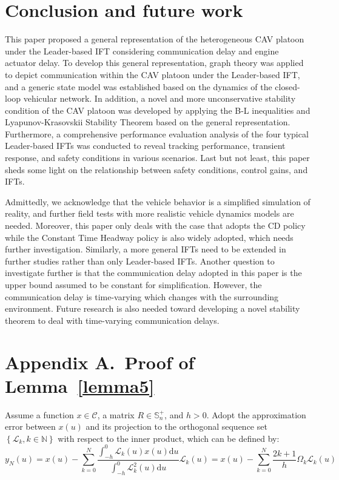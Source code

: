 \documentclass[a4paper]{cas-sc}
\begin{document}
\section{Conclusion and future work}
\label{Section 6}

This paper proposed a general representation of the heterogeneous CAV platoon under the Leader-based IFT considering communication delay and engine actuator delay. To develop this general representation, graph theory was applied to depict communication within the CAV platoon under the Leader-based IFT, and a generic state model was established based on the dynamics of the closed-loop vehicular network. In addition, a novel and more unconservative stability condition of the CAV platoon was developed by applying the B-L inequalities and Lyapunov-Krasovskii Stability Theorem based on the general representation. Furthermore, a comprehensive performance evaluation analysis of the four typical Leader-based IFTs was conducted to reveal tracking performance, transient response, and safety conditions in various scenarios. Last but not least, this paper sheds some light on the relationship between safety conditions, control gains, and IFTs.

Admittedly, we acknowledge that the vehicle behavior is a simplified simulation of reality, and further field tests with more realistic vehicle dynamics models are needed. Moreover, this paper only deals with the case that adopts the CD policy while the Constant Time Headway policy is also widely adopted, which needs further investigation. Similarly, a more general IFTs need to be extended in further studies rather than only Leader-based IFTs. Another question to investigate further is that the communication delay adopted in this paper is the upper bound assumed to be constant for simplification. However, the communication delay is time-varying which changes with the surrounding environment. Future research is also needed toward developing a novel stability theorem to deal with time-varying communication delays.

\appendix


\section*{Appendix A.~Proof of Lemma~\ref{lemma5}}
\label{AppendixA}

Assume a function $x \in \mathcal{C}$, a matrix $R \in \mathbb{S}_n^ +  $, and $h > 0 $. Adopt the approximation error between $x(u) $ and its projection to the orthogonal sequence set $\left\{ {{\mathcal{L}_k},k \in \mathbb{N}} \right\} $ with respect to the inner product, which can be defined by:
\begin{equation}
  {y_N}\left( u \right) = x(u) - \sum\limits_{k = 0}^N {\frac{{\int_{ - h}^0 {{\mathcal{L}_k}} (u)x(u){\text{d}}u}}{{\int_{ - h}^0 {\mathcal{L}_k^2} (u){\text{d}}u}}} {\mathcal{L}_k}(u) = x\left( u \right) - \sum\limits_{k = 0}^N {\frac{{2k + 1}}{h}} {\Omega _k}{\mathcal{L}_k}(u)
  \label{eqapp1}
\end{equation}
\end{document}
